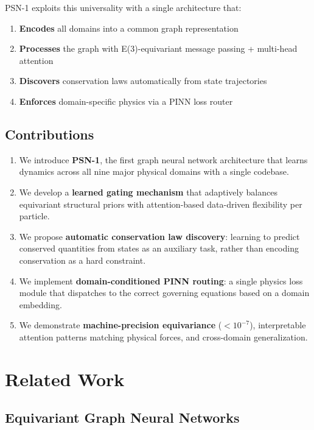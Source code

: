 \documentclass[11pt,a4paper]{article}
\begin{document}
PSN-1 exploits this universality with a single architecture that:
\begin{enumerate}[leftmargin=*]
    \item \textbf{Encodes} all domains into a common graph representation
    \item \textbf{Processes} the graph with E(3)-equivariant message passing + multi-head attention
    \item \textbf{Discovers} conservation laws automatically from state trajectories
    \item \textbf{Enforces} domain-specific physics via a PINN loss router
\end{enumerate}

\subsection{Contributions}

\begin{enumerate}[leftmargin=*]
    \item We introduce \textbf{PSN-1}, the first graph neural network architecture that learns dynamics across all nine major physical domains with a single codebase.
    \item We develop a \textbf{learned gating mechanism} that adaptively balances equivariant structural priors with attention-based data-driven flexibility per particle.
    \item We propose \textbf{automatic conservation law discovery}: learning to predict conserved quantities from states as an auxiliary task, rather than encoding conservation as a hard constraint.
    \item We implement \textbf{domain-conditioned PINN routing}: a single physics loss module that dispatches to the correct governing equations based on a domain embedding.
    \item We demonstrate \textbf{machine-precision equivariance} ($<10^{-7}$), interpretable attention patterns matching physical forces, and cross-domain generalization.
\end{enumerate}

\section{Related Work}

\subsection{Equivariant Graph Neural Networks}
\end{document}
